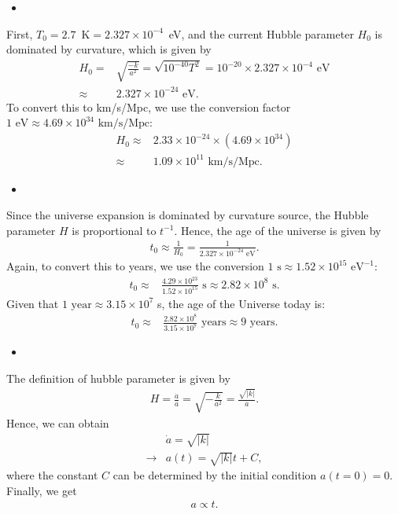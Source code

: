 \begin{itemize}
    \item [(b)]
\end{itemize}
First, $T_0=2.7$~K$=2.327\times10^{-4}$~eV, and the current Hubble parameter $H_0$ is dominated by curvature, which is given by 
\begin{align}
    H_0 =& \sqrt{\frac{-k}{a^2}}=\sqrt{10^{-40} T^2}=10^{-20}\times2.327\times10^{-4}\text{ eV}\\
    \approx&2.327\times 10^{-24} \text{ eV}.
\end{align}
To convert this to km/s/Mpc, we use the conversion factor $1 \text{ eV} \approx 4.69 \times 10^{34} \text{ km/s/Mpc}$:
\begin{align}
    H_0 \approx& 2.33 \times 10^{-24} \times (4.69 \times 10^{34}) \\
    \approx& 1.09 \times 10^{11} \text{ km/s/Mpc}.
\end{align}

\begin{itemize}
    \item [(c)]
\end{itemize}
Since the universe expansion is dominated by curvature source, the Hubble parameter $H$ is proportional to $t^{-1}$. Hence, the age of the universe is given by 
\begin{align}
    t_0\approx\frac{1}{H_0}=\frac{1}{2.327\times 10^{-24} \text{ eV}}.
\end{align}
Again, to convert this to years, we use the conversion $1 \text{ s} \approx 1.52 \times 10^{15} \text{ eV}^{-1}$:
\begin{align}
t_0 \approx& \frac{4.29 \times 10^{23}}{1.52 \times 10^{15}} \text{ s} \approx 2.82 \times 10^8 \text{ s}.
\end{align}
Given that $1 \text{ year} \approx 3.15 \times 10^7$ s, the age of the Universe today is:
\begin{align}
t_0 \approx& \frac{2.82 \times 10^8}{3.15 \times 10^7} \text{ years} \approx 9 \text{ years}.
\end{align}

\begin{itemize}
    \item [(d)]
\end{itemize}
The definition of hubble parameter is given by 
\begin{align}
    H= \frac{\dot{a}}{a}= \sqrt{- \frac{k}{a^2}}=\frac{\sqrt{|k|}}{a}.
\end{align}
Hence, we can obtain 
\begin{align}
    &\dot{a}=\sqrt{|k|} \\
    \rightarrow&a(t)=\sqrt{|k|}t + C, 
\end{align}
where the constant $C$ can be determined by the initial condition $a(t=0)=0$. Finally, we get 
\begin{align}
    a\propto t.
\end{align}

